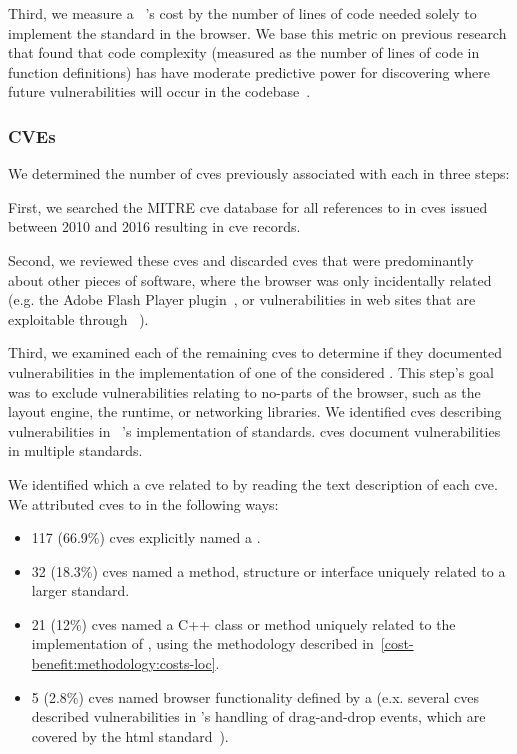 Third, we measure a \WAS~'s cost by the number of lines of code
needed solely to implement the standard in the browser. We base this metric
on previous research that found that code complexity (measured as the
number of lines of code in function definitions) has have moderate predictive
power for discovering where future vulnerabilities will occur in the
\FF codebase~\cite{shin2011evaluating}.


\subsubsection{CVEs}
\label{cost-benefit:methodology:costs-cves}
We determined the number of \gls{cve}s previously associated with each
\WAS in three steps:

First, we searched the MITRE \gls{cve} database for all references to \FF in
\gls{cve}s issued between 2010 and 2016 resulting in \NumFirefoxCVEs \gls{cve}
records.

Second, we reviewed these \gls{cve}s and discarded \NumFirefoxCVEsOther \gls{cve}s that
were predominantly about other pieces of software, where the browser was
only incidentally related (e.g. the Adobe Flash Player
plugin~\cite{cve_2012_4171}, or vulnerabilities in web sites that are
exploitable through \FF~\cite{cve_2013_2031}).

Third, we examined each of the remaining \gls{cve}s to
determine if they documented vulnerabilities in the implementation of one of the
\NumStandards considered \WASs.  This step's goal was to exclude vulnerabilities
relating to no-\WAPI parts of the browser, such as the layout engine,
the \JS runtime, or networking libraries.
We identified \NumFirefoxStandardCVEs \gls{cve}s describing vulnerabilities in
\FF~'s implementation of \NumStandardsWithCVE standards.
\NumCVEsWithMultipleStandards \gls{cve}s document vulnerabilities in multiple
standards.

We identified which \WAS a \gls{cve} related to by reading the text
description of each \gls{cve}. We attributed \gls{cve}s to \WAS
in the following ways:

\hspace{1em}
\begin{itemize}

  \item 117 (66.9\%) \gls{cve}s explicitly named a \WAS.
  \item 32 (18.3\%) \gls{cve}s named a \JS method, structure
        or interface uniquely related to a larger standard.
  \item 21 (12\%) \gls{cve}s named a C++ class or method uniquely
        related to the implementation of \WAS, using the methodology described
        in~\ref{cost-benefit:methodology:costs-loc}.
  \item 5 (2.8\%) \gls{cve}s named browser functionality defined by a \WAS
        (e.x. several \gls{cve}s described vulnerabilities in \FF's handling of
        drag-and-drop events, which are covered by the \gls{html}
        standard~\cite{whatwg2018html}).
\end{itemize}
\hspace{1em}

